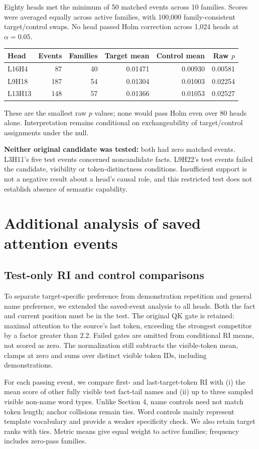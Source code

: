 \documentclass[11pt,a4paper]{article}
\begin{document}
Eighty heads met the minimum of 50 matched events across 10 families. Scores were averaged equally across active families, with 100,000 family-consistent target/control swaps. No head passed Holm correction across 1,024 heads at $\alpha=0.05$.

\begin{center}
\small
\begin{tabular}{lrrrrr}
\toprule
Head & Events & Families & Target mean & Control mean & Raw $p$ \\
\midrule
L16H4 & 87 & 40 & 0.01471 & 0.00930 & 0.00581 \\
L9H18 & 187 & 54 & 0.01304 & 0.01003 & 0.02254 \\
L13H13 & 148 & 57 & 0.01366 & 0.01053 & 0.02527 \\
\bottomrule
\end{tabular}
\end{center}
These are the smallest raw $p$ values; none would pass Holm even over 80 heads alone. Interpretation remains conditional on exchangeability of target/control assignments under the null.

\textbf{Neither original candidate was tested:} both had zero matched events. L3H11's five test events concerned noncandidate facts. L9H22's test events failed the candidate, visibility or token-distinctness conditions. Insufficient support is not a negative result about a head's causal role, and this restricted test does not establish absence of semantic capability.

\section{Additional analysis of saved attention events}
\subsection{Test-only RI and control comparisons}
To separate target-specific preference from demonstration repetition and general name preference, we extended the saved-event analysis to all heads. Both the fact and current position must be in the test. The original QK gate is retained: maximal attention to the source's last token, exceeding the strongest competitor by a factor greater than $2.2$. Failed gates are omitted from conditional RI means, not scored as zero. The normalization still subtracts the visible-token mean, clamps at zero and sums over distinct visible token IDs, including demonstrations.

For each passing event, we compare first- and last-target-token RI with (i) the mean score of other fully visible test fact-tail names and (ii) up to three sampled visible non-name word types. Unlike Section 4, name controls need not match token length; anchor collisions remain ties. Word controls mainly represent template vocabulary and provide a weaker specificity check. We also retain target ranks with ties. Metric means give equal weight to active families; frequency includes zero-pass families.
\end{document}
